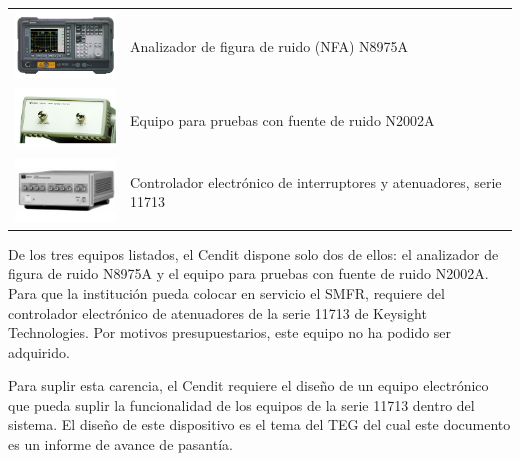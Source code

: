 \documentclass[paper=letter,oneside,fontsize=12pt, parskip=full]{article}
\begin{document}
	\begin{table}[h!]
		\begin{tabular}{p{3cm}l}
			\begin{minipage}{3cm}
				\includegraphics[width=3cm]{Imagenes/N8975A.pdf}
			\end{minipage} &
			Analizador de figura de ruido (NFA) N8975A \\

			\begin{minipage}{3cm}
				\includegraphics[width=3cm]{Imagenes/N2002A.pdf}
			\end{minipage} &
			Equipo para pruebas con fuente de ruido N2002A \\
			
			\begin{minipage}{3cm}
				\includegraphics[width=3cm]{Imagenes/11713A.pdf}
			\end{minipage} &			
			Controlador electrónico de interruptores y atenuadores, serie 11713 
		\end{tabular}
	\end{table}

	De los tres equipos listados, el Cendit dispone solo dos de ellos: el analizador de figura de ruido N8975A y el equipo para pruebas con fuente de ruido N2002A. Para que la institución pueda colocar en servicio el SMFR, requiere del controlador electrónico de atenuadores de la serie 11713 de Keysight Technologies. Por motivos presupuestarios, este equipo no ha podido ser adquirido.
	
	Para suplir esta carencia, el Cendit requiere el diseño de un equipo electrónico que pueda suplir la funcionalidad de los equipos de la serie 11713 dentro del sistema. El diseño de este dispositivo es el tema del TEG del cual este documento es un informe de avance de pasantía.
	
\end{document}
